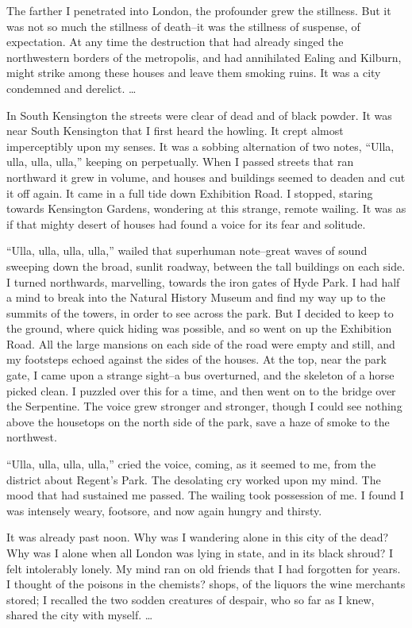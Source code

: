 The farther I penetrated into London, the profounder grew the
stillness. But it was not so much the stillness of death--it was
the stillness of suspense, of expectation. At any time the
destruction that had already singed the northwestern borders of the
metropolis, and had annihilated Ealing and Kilburn, might strike
among these houses and leave them smoking ruins. It was a city
condemned and derelict. \ldots{}

In South Kensington the streets were clear of dead and of black
powder. It was near South Kensington that I first heard the
howling. It crept almost imperceptibly upon my senses. It was a
sobbing alternation of two notes, ``Ulla, ulla, ulla, ulla,'' keeping
on perpetually. When I passed streets that ran northward it grew in
volume, and houses and buildings seemed to deaden and cut it off
again. It came in a full tide down Exhibition Road. I stopped,
staring towards Kensington Gardens, wondering at this strange,
remote wailing. It was as if that mighty desert of houses had found
a voice for its fear and solitude.

``Ulla, ulla, ulla, ulla,'' wailed that superhuman note--great waves
of sound sweeping down the broad, sunlit roadway, between the tall
buildings on each side. I turned northwards, marvelling, towards
the iron gates of Hyde Park. I had half a mind to break into the
Natural History Museum and find my way up to the summits of the
towers, in order to see across the park. But I decided to keep to
the ground, where quick hiding was possible, and so went on up the
Exhibition Road. All the large mansions on each side of the road
were empty and still, and my footsteps echoed against the sides of
the houses. At the top, near the park gate, I came upon a strange
sight--a bus overturned, and the skeleton of a horse picked clean.
I puzzled over this for a time, and then went on to the bridge over
the Serpentine. The voice grew stronger and stronger, though I
could see nothing above the housetops on the north side of the
park, save a haze of smoke to the northwest.

``Ulla, ulla, ulla, ulla,'' cried the voice, coming, as it seemed to
me, from the district about Regent's Park. The desolating cry
worked upon my mind. The mood that had sustained me passed. The
wailing took possession of me. I found I was intensely weary,
footsore, and now again hungry and thirsty.

It was already past noon. Why was I wandering alone in this city of
the dead? Why was I alone when all London was lying in state, and
in its black shroud? I felt intolerably lonely. My mind ran on old
friends that I had forgotten for years. I thought of the poisons in
the chemists? shops, of the liquors the wine merchants stored; I
recalled the two sodden creatures of despair, who so far as I knew,
shared the city with myself. \ldots{}

